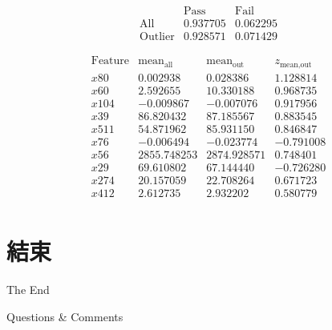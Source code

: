 \documentclass[12pt,aspectratio=43]{beamer}
\begin{document}
\begin{frame}

$$
\begin{array}{c|cc}
        & \text{Pass} & \text{Fail} \\ \hline
\text{All}     & 0.937705 & 0.062295 \\
\text{Outlier} & 0.928571 & 0.071429
\end{array}
$$

$$
\begin{array}{c|rrr}
\text{Feature} & \text{mean}_{\text{all}} & \text{mean}_{\text{out}} & z_{\text{mean,out}} \\ \hline
x80  & 0.002938   & 0.028386   &  1.128814 \\
x60  & 2.592655   &10.330188   &  0.968735 \\
x104 &-0.009867   &-0.007076   &  0.917956 \\
x39  &86.820432   &87.185567   &  0.883545 \\
x511 &54.871962   &85.931150   &  0.846847 \\
x76  &-0.006494   &-0.023774   & -0.791008 \\
x56  &2855.748253 &2874.928571 &  0.748401 \\
x29  &69.610802   &67.144440   & -0.726280 \\
x274 &20.157059   &22.708264   &  0.671723 \\
x412 & 2.612735   & 2.932202   &  0.580779 \\
\end{array}
$$

\end{frame}

\section*{結束}

\begin{frame}[plain] %
	\begin{center}
		{\Huge The End}
		\bigskip\bigskip 

		{\LARGE Questions  \&  Comments}
	\end{center}
\end{frame}
\end{document}
